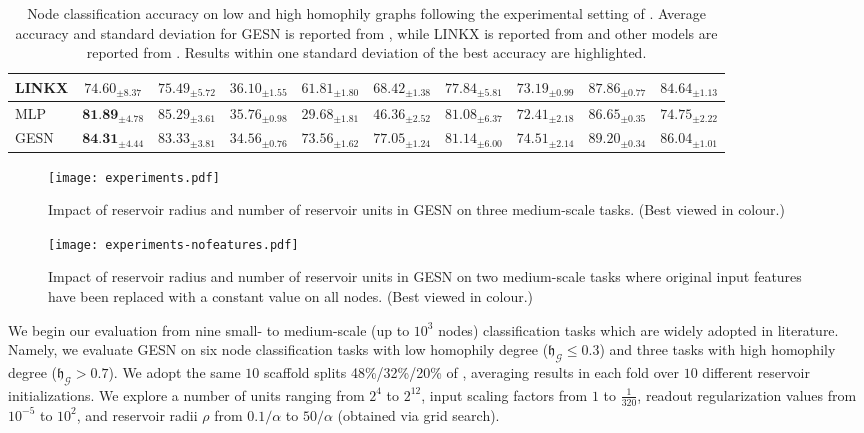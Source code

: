 \documentclass[final,5p,times,twocolumn]{elsarticle}
\begin{document}
\begin{table*}
\begin{tabular}{lccccccccc}
		LINKX & $74.60_{\pm 8.37}$ & $75.49_{\pm 5.72}$ & $\mathbf{36.10}_{\pm 1.55}$ & $61.81_{\pm 1.80}$ & $68.42_{\pm 1.38}$ & $\mathbf{77.84}_{\pm 5.81}$ & $73.19_{\pm 0.99}$ & $87.86_{\pm 0.77}$ & $84.64_{\pm 1.13}$ \\
		\midrule
		MLP & $\textbf{81.89}_{\pm 4.78}$ & $\mathbf{85.29}_{\pm 3.61}$ & $\mathbf{35.76}_{\pm 0.98}$ & $29.68_{\pm 1.81}$ & $46.36_{\pm 2.52}$ & $\mathbf{81.08}_{\pm 6.37}$ & $72.41_{\pm 2.18}$ & $86.65_{\pm 0.35}$ & $74.75_{\pm 2.22}$ \\
		\midrule
		GESN & $\textbf{84.31}_{\pm 4.44}$ & $\mathbf{83.33}_{\pm 3.81}$ & $\mathbf{34.56}_{\pm 0.76}$ & $\mathbf{73.56}_{\pm 1.62}$ & $\mathbf{77.05}_{\pm 1.24}$ & $\mathbf{81.14}_{\pm 6.00}$ & $74.51_{\pm 2.14}$ & $\mathbf{89.20}_{\pm 0.34}$ & $86.04_{\pm 1.01}$ \\
		\bottomrule
	\end{tabular}
	\endgroup
\caption{Node classification accuracy on low and high homophily graphs following the experimental setting of \cite{Zhu2020}. Average accuracy and standard deviation for GESN is reported from \cite{Tortorella2022esann}, while LINKX is reported from \cite{Lim2021} and other models are reported from \cite{Zhu2020}. Results within one standard deviation of the best accuracy are highlighted.}
\label{tab:experiments-esann}
\end{table*}

\begin{figure*}
	\centering
	\texttt{[image: experiments.pdf]}
	\caption{Impact of reservoir radius and number of reservoir units in GESN on three medium-scale tasks. (Best viewed in colour.)}
	\label{fig:esann-experiments}
\end{figure*}

\begin{figure*}
	\centering
	\texttt{[image: experiments-nofeatures.pdf]}
	\caption{Impact of reservoir radius and number of reservoir units in GESN on two medium-scale tasks where original input features have been replaced with a constant value on all nodes. (Best viewed in colour.)}
	\label{fig:esann-no-features}
\end{figure*}

We begin our evaluation from nine small- to medium-scale (up to $10^3$ nodes) classification tasks which are widely adopted in literature.
Namely, we evaluate GESN on six node classification tasks with low homophily degree ($\mathfrak{h}_\mathcal{G} \leq 0.3$) and three tasks with high homophily degree ($\mathfrak{h}_\mathcal{G} > 0.7$).
We adopt the same $10$ scaffold splits 48\%/32\%/20\% of \cite{Zhu2020}, averaging results in each fold over $10$ different reservoir initializations.
We explore a number of units ranging from $2^4$ to $2^{12}$, input scaling factors from $1$ to $\frac{1}{320}$, readout regularization values from $10^{-5}$ to $10^2$, and reservoir radii $\rho$ from $0.1/\alpha$ to $50/\alpha$ (obtained via grid search).
\end{document}
